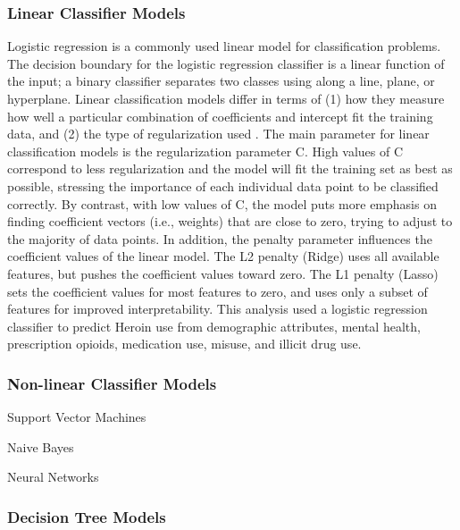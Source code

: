 \documentclass[sigconf]{acmart}
\begin{document}
\subsubsection{Linear Classifier Models}

Logistic regression is a commonly used linear model for classification 
problems. The decision boundary for the logistic regression classifier is a 
linear function of the input; a binary classifier separates two classes using 
along a line, plane, or hyperplane. Linear classification models differ in 
terms of (1) how they measure how well a particular combination of coefficients 
and intercept fit the training data, and (2) the type of regularization used 
\cite{muller17}. The main parameter for linear classification models is the
regularization parameter C. High values of C correspond to less regularization 
and the model will fit the training set as best as possible, stressing the 
importance of each individual data point to be classified correctly. By 
contrast, with low values of C, the model puts more emphasis on finding 
coefficient vectors (i.e., weights) that are close to zero, trying to adjust to 
the majority of data points. In addition, the penalty parameter influences the 
coefficient values of the linear model. The L2 penalty (Ridge) uses all 
available features, but pushes the coefficient values toward zero. The L1 
penalty (Lasso) sets the coefficient values for most features to zero, and uses 
only a subset of features for improved interpretability. This analysis used a 
logistic regression classifier to predict Heroin use from demographic 
attributes, mental health, prescription opioids, medication use, misuse, 
and illicit drug use. 

\subsubsection{Non-linear Classifier Models}

Support Vector Machines


Naive Bayes


Neural Networks



\subsubsection{Decision Tree Models}
\end{document}
